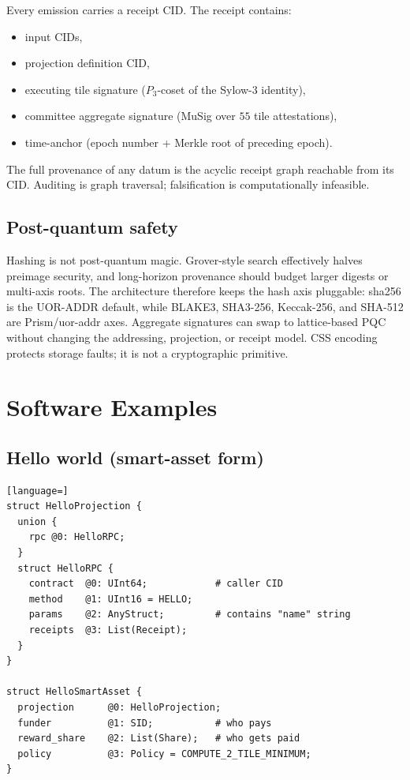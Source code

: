 \documentclass[11pt,letterpaper]{article}
\theoremstyle{remark}
\begin{document}
Every emission carries a receipt CID. The receipt contains:
\begin{itemize}[leftmargin=2em,nosep]
\item input CIDs,
\item projection definition CID,
\item executing tile signature ($P_3$-coset of the Sylow-$3$ identity),
\item committee aggregate signature (MuSig over $55$ tile attestations),
\item time-anchor (epoch number + Merkle root of preceding epoch).
\end{itemize}
The full provenance of any datum is the acyclic receipt graph reachable from its CID.
Auditing is graph traversal; falsification is computationally infeasible.

\subsection{Post-quantum safety}

Hashing is not post-quantum magic. Grover-style search effectively halves preimage
security, and long-horizon provenance should budget larger digests or multi-axis roots.
The architecture therefore keeps the hash axis pluggable: sha256 is the UOR-ADDR default,
while BLAKE3, SHA3-256, Keccak-256, and SHA-512 are Prism/uor-addr axes. Aggregate
signatures can swap to lattice-based PQC without changing the addressing, projection, or
receipt model. CSS encoding protects storage faults; it is not a cryptographic primitive.

\section{Software Examples}

\subsection{Hello world (smart-asset form)}

\begin{lstlisting}[language=]
struct HelloProjection {
  union {
    rpc @0: HelloRPC;
  }
  struct HelloRPC {
    contract  @0: UInt64;            # caller CID
    method    @1: UInt16 = HELLO;
    params    @2: AnyStruct;         # contains "name" string
    receipts  @3: List(Receipt);
  }
}

struct HelloSmartAsset {
  projection      @0: HelloProjection;
  funder          @1: SID;           # who pays
  reward_share    @2: List(Share);   # who gets paid
  policy          @3: Policy = COMPUTE_2_TILE_MINIMUM;
}
\end{lstlisting}
\end{document}
